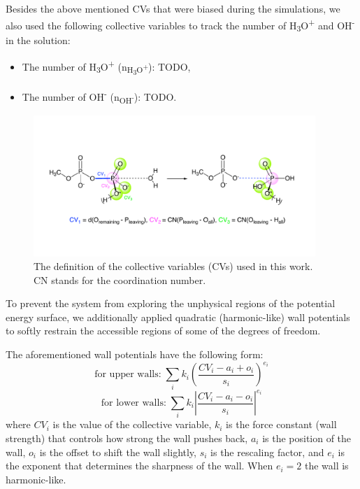 Besides the above mentioned CVs that were biased during the simulations, we also used the following collective variables to track the number of H\textsubscript{3}O\textsuperscript{+} and OH\textsuperscript{-} in the solution:
\begin{itemize}
    \item The number of H\textsubscript{3}O\textsuperscript{+} (n\textsubscript{H\textsubscript{3}O\textsuperscript{+}}): TODO,
    \item The number of OH\textsuperscript{-} (n\textsubscript{OH\textsuperscript{-}}): TODO.
\end{itemize}

\begin{figure}[t!]
    \centering
    \includegraphics[width=0.95\textwidth]{Figures/3_Computational_details/collective_variables.pdf}
    \caption{The definition of the collective variables (CVs) used in this work. CN stands for the coordination number.}
    \label{fig:collective_variables}
\end{figure}

To prevent the system from exploring the unphysical regions of the potential energy surface, we additionally applied quadratic (harmonic-like) wall potentials to softly restrain the accessible regions of some of the degrees of freedom. 

The aforementioned wall potentials have the following form:
\begin{equation}
    \text{for upper walls:} \; \sum_i k_i \left( \frac{CV_i - a_i + o_i}{s_i} \right)^{e_i}
    \label{eq:upper_wall}
\end{equation}
\begin{equation}
    \text{for lower walls:} \; \sum_i k_i \left| \frac{CV_i - a_i - o_i}{s_i} \right|^{e_i}
    \label{eq:lower_wall}
\end{equation}
where $CV_i$ is the value of the collective variable, $k_i$ is the force constant (wall strength) that controls how strong the wall pushes back, $a_i$ is the position of the wall, $o_i$ is the offset to shift the wall slightly, $s_i$ is the rescaling factor, and $e_i$ is the exponent that determines the sharpness of the wall. When $e_i = 2$ the wall is harmonic-like. 

